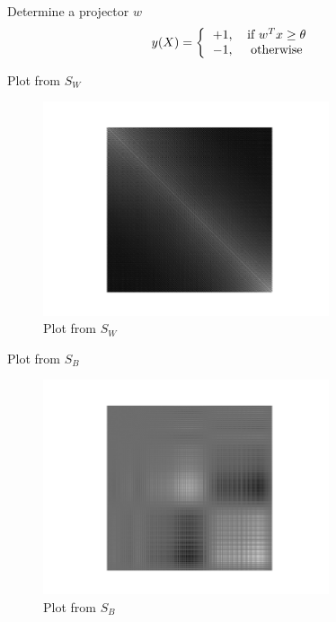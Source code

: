 \documentclass[handout]{beamer}
\begin{document}
\begin{frame}{Determine a projector $w$}
    \Huge
    \begin{equation}
        y(X) = \left\{
                    \begin{tabular}{cc}
                        $+1$, & if $w^{T}x \geq \theta$ \\
                        $-1$, & otherwise
                    \end{tabular}
                \right.
    \end{equation}
\end{frame}

\begin{frame}{Plot from $S_W$}
    {\centering
    \begin{figure}[H]
        \includegraphics[width=0.75\textwidth]{project_03/s_w.png}
        \caption{Plot from $S_W$}
    \end{figure}
    }
\end{frame}

\begin{frame}{Plot from $S_B$}
    {\centering
    \begin{figure}[H]
        \includegraphics[width=0.75\textwidth]{project_03/s_b.png}
        \caption{Plot from $S_B$}
    \end{figure}
    }
\end{frame}
\end{document}
